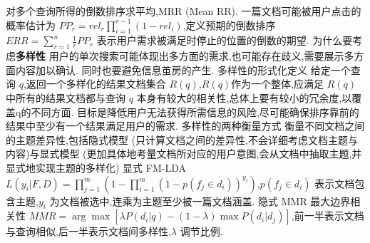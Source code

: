 \documentclass[10pt, utf8]{ctexart}
\begin{document}
\begin{multicols}{4}
    对多个查询所得的倒数排序求平均,MRR (Mean RR).
    一篇文档可能被用户点击的概率估计为 $PP_r=rel_r\prod_{i=1}^{r-1}(1-rel_i)$,定义预期的倒数排序 $ERR=\sum_{r=1}^n\frac{1}{r}PP_r$ 表示用户需求被满足时停止的位置的倒数的期望.
    {\color{blue}为什么要考虑\color{purple_}\textbf{多样性}}
    用户的单次搜索可能体现出多方面的需求,也可能存在歧义,需要展示多方面内容加以确认.
    同时也要避免信息茧房的产生.
    {\color{blue}多样性的形式化定义}
    给定一个查询 $q$,返回一个多样化的结果文档集合 $R(q)$,$R(q)$作为一个整体,应满足
    $R(q)$ 中所有的结果文档都与查询 $q$ 本身有较大的相关性,总体上要有较小的冗余度,以覆盖q的不同方面.
    目标是降低用户无法获得所需信息的风险,尽可能确保排序靠前的结果中至少有一个结果满足用户的需求.
    {\color{blue}多样性的两种衡量方式}
    衡量不同文档之间的主题差异性,包括隐式模型 (只计算文档之间的差异性,不会详细考虑文档主题与内容)与显式模型 (更加具体地考量文档所对应的用户意图,会从文档中抽取主题,并显式地实现主题的多样化)
    显式 FM-LDA $L(y_i|F,D)=\prod_{j=1}^m(1-\prod_{i=1}^m{(1-p(f_j\in d_i))}^{y_i})$,$p(f_j\in d_i)$ 表示文档包含主题,$y_i$ 为文档被选中,连乘为主题至少被一篇文档涵盖.
    隐式 MMR 最大边界相关性 $MMR=\arg\max[\lambda P(d_i|q)-(1-\lambda)\max P(d_i|d_j)]$,前一半表示文档与查询相似,后一半表示文档间多样性,$\lambda$ 调节比例.


\end{multicols}
\end{document}
